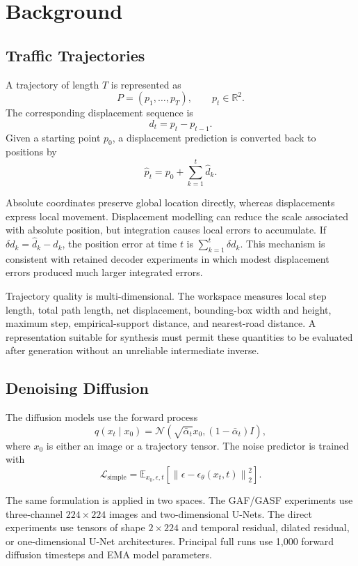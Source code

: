 \documentclass[12pt,a4paper,oneside]{report}
\begin{document}
\chapter{Background}
\label{chap:background}

\section{Traffic Trajectories}

A trajectory of length $T$ is represented as
\[
P=(p_1,\ldots,p_T), \qquad p_t\in\mathbb{R}^2.
\]
The corresponding displacement sequence is
\[
d_t=p_t-p_{t-1}.
\]
Given a starting point $p_0$, a displacement prediction is converted back to positions by
\[
\hat p_t=p_0+\sum_{k=1}^{t}\hat d_k.
\]

Absolute coordinates preserve global location directly, whereas displacements express local movement. Displacement modelling can reduce the scale associated with absolute position, but integration causes local errors to accumulate. If $\delta d_k=\hat d_k-d_k$, the position error at time $t$ is $\sum_{k=1}^{t}\delta d_k$. This mechanism is consistent with retained decoder experiments in which modest displacement errors produced much larger integrated errors.

Trajectory quality is multi-dimensional. The workspace measures local step length, total path length, net displacement, bounding-box width and height, maximum step, empirical-support distance, and nearest-road distance. A representation suitable for synthesis must permit these quantities to be evaluated after generation without an unreliable intermediate inverse.

\section{Denoising Diffusion}

The diffusion models use the forward process
\[
q(x_t\mid x_0)=\mathcal{N}\!\left(\sqrt{\bar\alpha_t}x_0,(1-\bar\alpha_t)I\right),
\]
where $x_0$ is either an image or a trajectory tensor. The noise predictor is trained with
\[
\mathcal{L}_{\mathrm{simple}}=
\mathbb{E}_{x_0,\epsilon,t}
\left[\left\|\epsilon-\epsilon_\theta(x_t,t)\right\|_2^2\right].
\]

The same formulation is applied in two spaces. The GAF/GASF experiments use three-channel $224\times224$ images and two-dimensional U-Nets. The direct experiments use tensors of shape $2\times224$ and temporal residual, dilated residual, or one-dimensional U-Net architectures. Principal full runs use 1,000 forward diffusion timesteps and EMA model parameters.
\end{document}
